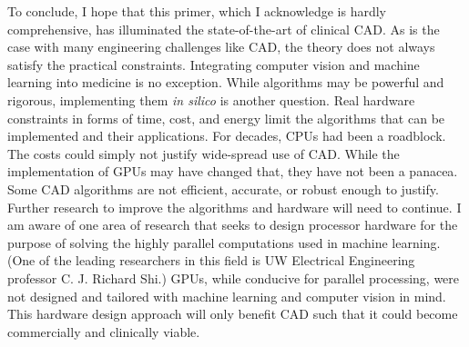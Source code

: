 \documentclass{bmcart}
\begin{document}
\par To conclude, I hope that this primer, which I acknowledge is hardly comprehensive, has illuminated the state-of-the-art of clinical CAD. As is the case with many engineering challenges like CAD, the theory does not always satisfy the practical constraints. Integrating computer vision and machine learning into medicine is no exception. While algorithms may be powerful and rigorous, implementing them \textit{in silico} is another question. Real hardware constraints in forms of time, cost, and energy limit the algorithms that can be implemented and their applications. For decades, CPUs had been a roadblock. The costs could simply not justify wide-spread use of CAD. While the implementation of GPUs may have changed that, they have not been a panacea. Some CAD algorithms are not efficient, accurate, or robust enough to justify. Further research to improve the algorithms and hardware will need to continue. I am aware of one area of research that seeks to design processor hardware for the purpose of solving the highly parallel computations used in machine learning. (One of the leading researchers in this field is UW Electrical Engineering professor C. J. Richard Shi.) GPUs, while conducive for parallel processing, were not designed and tailored with machine learning and computer vision in mind. This hardware design approach will only benefit CAD such that it could become commercially and clinically viable.





\end{document}
